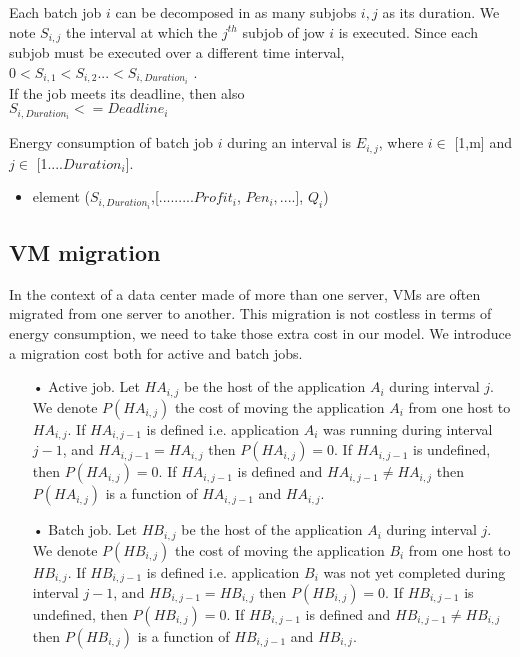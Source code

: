 \documentclass[a4paper]{article}
\begin{document}
Each batch job $i$ can be decomposed in as many subjobs $i,j$ as its duration. We note $S_{i,j}$ the interval at which the $j^{th}$ subjob of jow $i$ is executed.
Since each subjob must be executed over a different time interval,\\
$0< S_{i,1}<S_{i,2}$...$<S_{i,Duration_i}$ .\\
If the job meets its deadline, then also\\
$S_{i,Duration_i}<=Deadline_i$

Energy consumption of batch job $i$ during an interval is $E_{i,j}$, where $i\in$ [1,m] and $j\in$ [1....$Duration_i$]. 
\begin{itemize}
 \item element ($S_{i,Duration_i}$,[.........$Profit_i$, $Pen_i,....$], $Q_i$)
\end{itemize}

\subsection{VM migration}
In the context of a data center made of more than one server, VMs are often migrated from one server to another. This migration is not costless in terms of energy consumption, we need to take those extra cost in our model. We introduce a migration cost both for active and batch jobs.

\begin{itemize}
\item[•] Active job.
Let $HA_{i,j}$ be the host of the application $A_i$ during interval $j$. We denote $P(HA_{i,j})$ the cost of moving the application $A_i$ from one host to $HA_{i,j}$. If $HA_{i,j-1}$ is defined i.e. application $A_i$ was running during interval $j-1$, and $HA_{i,j-1} = HA_{i,j}$ then $P(HA_{i,j}) = 0$. If $HA_{i,j-1}$ is undefined, then $P(HA_{i,j}) = 0$. If $HA_{i,j-1}$ is defined and $HA_{i,j-1} \neq HA_{i,j}$ then $P(HA_{i,j})$ is a function of $HA_{i,j-1}$ and $HA_{i,j}$.

\item[•] Batch job.
Let $HB_{i,j}$ be the host of the application $A_i$ during interval $j$. We denote $P(HB_{i,j})$ the cost of moving the application $B_i$ from one host to $HB_{i,j}$. If $HB_{i,j-1}$ is defined i.e. application $B_i$ was not yet completed during interval $j-1$, and $HB_{i,j-1} = HB_{i,j}$ then $P(HB_{i,j}) = 0$. If $HB_{i,j-1}$ is undefined, then $P(HB_{i,j}) = 0$. If $HB_{i,j-1}$ is defined and $HB_{i,j-1} \neq HB_{i,j}$ then $P(HB_{i,j})$ is a function of $HB_{i,j-1}$ and $HB_{i,j}$.

\end{itemize}
\end{document}
